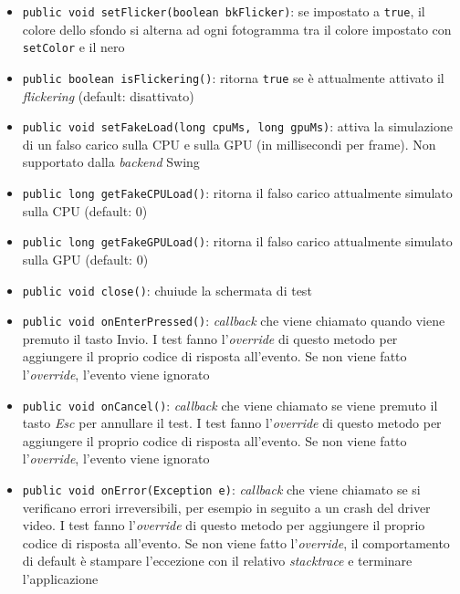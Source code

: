 \begin{itemize}
	\item \texttt{public void setFlicker(boolean bkFlicker)}: se impostato a \texttt{true}, il colore dello sfondo si alterna ad ogni fotogramma tra il colore impostato con \texttt{setColor} e il nero
	\item \texttt{public boolean isFlickering()}: ritorna \texttt{true} se è attualmente attivato il \textit{flickering} (default: disattivato)
	\item \texttt{public void setFakeLoad(long cpuMs, long gpuMs)}: attiva la simulazione di un falso carico sulla CPU e sulla GPU (in millisecondi per frame). Non supportato dalla \textit{backend} Swing
	\item \texttt{public long getFakeCPULoad()}: ritorna il falso carico attualmente simulato sulla CPU (default: 0)
	\item \texttt{public long getFakeGPULoad()}: ritorna il falso carico attualmente simulato sulla GPU (default: 0)
	\item \texttt{public void close()}: chuiude la schermata di test
	\item \texttt{public void onEnterPressed()}: \textit{callback} che viene chiamato quando viene premuto il tasto Invio. I test fanno l'\textit{override} di questo metodo per aggiungere il proprio codice di risposta all'evento. Se non viene fatto l'\textit{override}, l'evento viene ignorato
	\item \texttt{public void onCancel()}: \textit{callback} che viene chiamato se viene premuto il tasto \textit{Esc} per annullare il test. I test fanno l'\textit{override} di questo metodo per aggiungere il proprio codice di risposta all'evento. Se non viene fatto l'\textit{override}, l'evento viene ignorato
	\item \texttt{public void onError(Exception e)}: \textit{callback} che viene chiamato se si verificano errori irreversibili, per esempio in seguito a un crash del driver video. I test fanno l'\textit{override} di questo metodo per aggiungere il proprio codice di risposta all'evento. Se non viene fatto l'\textit{override}, il comportamento di default è stampare l'eccezione con il relativo \textit{stacktrace} e terminare l'applicazione
\end{itemize}

